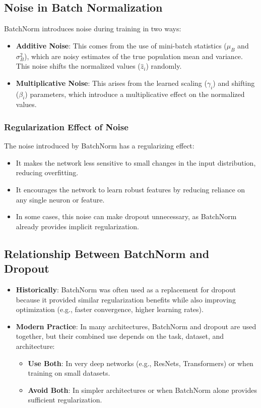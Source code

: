 \begin{notechapter}
\subsection{Noise in Batch Normalization}
BatchNorm introduces noise during training in two ways:
\begin{itemize}
    \item \textbf{Additive Noise}: This comes from the use of mini-batch
    statistics (\(\mu_B\) and \(\sigma_B^2\)), which are noisy estimates
    of the true population mean and variance. This noise shifts the
    normalized values (\(\hat{z}_i\)) randomly.

    \item \textbf{Multiplicative Noise}: This arises from the learned
    scaling (\(\gamma_i\)) and shifting (\(\beta_i\)) parameters, which
    introduce a multiplicative effect on the normalized values.
\end{itemize}

\subsubsection{Regularization Effect of Noise}
The noise introduced by BatchNorm has a regularizing effect:
\begin{itemize}
    \item It makes the network less sensitive to small changes in the
    input distribution, reducing overfitting.
    \item It encourages the network to learn robust features by reducing
    reliance on any single neuron or feature.
    \item In some cases, this noise can make dropout unnecessary, as
    BatchNorm already provides implicit regularization.
\end{itemize}

\subsection{Relationship Between BatchNorm and Dropout}
\begin{itemize}
    \item \textbf{Historically}: BatchNorm was often used as a replacement
    for dropout because it provided similar regularization benefits while
    also improving optimization (e.g., faster convergence, higher learning
    rates).
    \item \textbf{Modern Practice}: In many architectures, BatchNorm and
    dropout are used together, but their combined use depends on the task,
    dataset, and architecture:
    \begin{itemize}
        \item \textbf{Use Both}: In very deep networks (e.g., ResNets,
        Transformers) or when training on small datasets.
        \item \textbf{Avoid Both}: In simpler architectures or when BatchNorm
        alone provides sufficient regularization.
    \end{itemize}
\end{itemize}


\end{notechapter}
